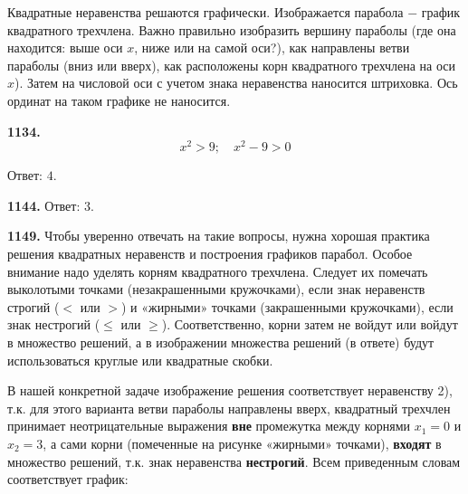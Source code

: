 Квадратные неравенства решаются графически. Изображается парабола $-$ график квадратного трехчлена. Важно правильно изобразить вершину параболы (где она находится: выше оси $x$, ниже или на самой оси?), как направлены ветви параболы (вниз или вверх), как  расположены корн квадратного трехчлена на оси $x$). Затем на числовой оси с учетом знака неравенства наносится штриховка. Ось ординат на таком графике не наносится.

\textbf{1134.} $$x^2>9;\quad x^2-9>0$$      

\begin{figure}[h!]
\end{figure}

\null \hspace*{\fill} Ответ: $4$.  

\textbf{1144.} \newline \null \hspace*{\fill} Ответ: $3$. 

\textbf{1149.} Чтобы уверенно отвечать на такие вопросы, нужна хорошая практика решения квадратных неравенств и построения графиков парабол. Особое внимание надо уделять корням квадратного трехчлена. Следует их помечать выколотыми точками (незакрашенными кружочками),  если знак неравенств строгий ($<$ или $>$) и «жирными» точками (закрашенными кружочками), если знак нестрогий ($\leq$ или $\geq$). Соответственно, корни затем не войдут или войдут в множество решений, а в изображении множества решений (в ответе) будут использоваться круглые  или квадратные скобки.

В нашей конкретной задаче изображение решения соответствует неравенству 2), т.к. для этого варианта  ветви параболы направлены вверх, квадратный трехчлен принимает неотрицательные выражения \textbf{вне} промежутка между корнями $x_1=0$ и $x_2=3$, а сами корни (помеченные на рисунке «жирными» точками), \textbf{входят} в множество решений, т.к. знак неравенства \textbf{нестрогий}. Всем приведенным словам соответствует график:

\begin{figure}[h!]
\end{figure}

